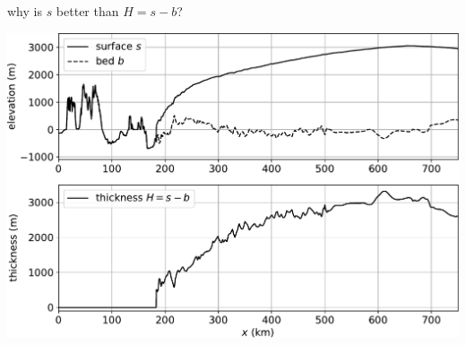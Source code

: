 \documentclass[10pt,dvipsnames]{beamer}
\begin{document}
\begin{frame}{why is $s$ better than $H=s-b$?}

\begin{center}
\includegraphics[height=0.84\textheight]{giscross}
\end{center}
\end{frame}
\end{document}
